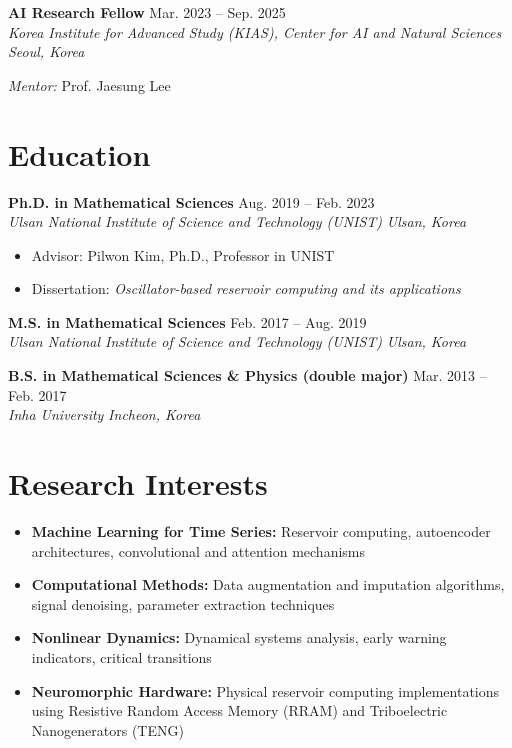 \documentclass[11pt,a4paper]{article}
\newcommand{\cventry}[4]{
    \noindent\textbf{#1} \hfill #2 \\
    \textit{#3} \hfill \textit{#4}
}
\begin{document}
\cventry{AI Research Fellow}{Mar. 2023 -- Sep. 2025}
{Korea Institute for Advanced Study (KIAS), Center for AI and Natural Sciences}{Seoul, Korea}
\vspace{1pt}
{\small \hspace*{1.2em} \textit{Mentor:} Prof. Jaesung Lee}

\section*{Education}

\cventry{Ph.D. in Mathematical Sciences}{Aug. 2019 -- Feb. 2023}
{Ulsan National Institute of Science and Technology (UNIST)}{Ulsan, Korea}
\begin{itemize}[leftmargin=1.5em, topsep=0.2em, itemsep=0.1em]
    \item Advisor: Pilwon Kim, Ph.D., Professor in UNIST
    \item Dissertation: \textit{Oscillator-based reservoir computing and its applications}
\end{itemize}

\vspace{0.3em}

\cventry{M.S. in Mathematical Sciences}{Feb. 2017 -- Aug. 2019}
{Ulsan National Institute of Science and Technology (UNIST)}{Ulsan, Korea}

\vspace{0.3em}

\cventry{B.S. in Mathematical Sciences \& Physics (double major)}{Mar. 2013 -- Feb. 2017}
{Inha University}{Incheon, Korea}

\section*{Research Interests}

\begin{itemize}[leftmargin=1.5em, topsep=0.2em, itemsep=0.1em]
    \item \textbf{Machine Learning for Time Series:} Reservoir computing, autoencoder architectures, convolutional and attention mechanisms
    \item \textbf{Computational Methods:} Data augmentation and imputation algorithms, signal denoising, parameter extraction techniques
    \item \textbf{Nonlinear Dynamics:} Dynamical systems analysis, early warning indicators, critical transitions
    \item \textbf{Neuromorphic Hardware:} Physical reservoir computing implementations using Resistive Random Access Memory (RRAM) and Triboelectric Nanogenerators (TENG)
\end{itemize}
\end{document}
